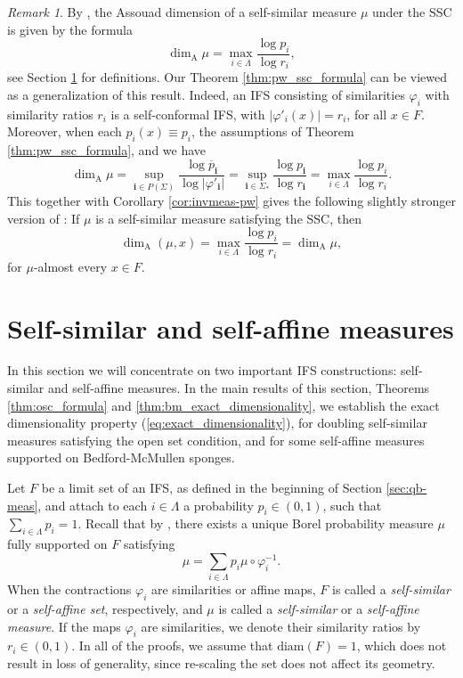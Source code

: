 \documentclass{PRM}
\newcommand{\diam}{\mathrm{diam}}
\theoremstyle{plain}
\theoremstyle{definition}
\theoremstyle{remark}
\newtheorem{huom}[thm]{Remark}
\begin{document}
\begin{huom}\label{huom:ssm}
By \cite[Theorem 2.4]{FH}, the Assouad dimension of a self-similar measure $\mu$ under the SSC is given by the formula
\begin{equation}\label{eq:ssc_formula}
    \dim_{\mathrm{A}}\mu=\max_{i\in\Lambda}\frac{\log p_i}{\log r_i},
\end{equation}
see Section \ref{sec:ssm} for definitions. Our Theorem \ref{thm:pw_ssc_formula} can be viewed as a generalization of this result. Indeed, an IFS consisting of similarities $\varphi_i$ with similarity ratios $r_i$ is a self-conformal IFS, with $|\varphi'_i(x)|=r_i$, for all $x\in F$. Moreover, when each $p_i(x)\equiv p_i$, the assumptions of Theorem \ref{thm:pw_ssc_formula}, and we have
\begin{equation*}
    \dim_{\mathrm{A}}\mu=\sup_{\mathbf{i}\in P(\Sigma)}\frac{\log \overline{p}_{\mathbf{i}}}{\log |\varphi'_{\mathbf{i}}|}=\sup_{\mathbf{i}\in \Sigma_*}\frac{\log p_{\mathbf{i}}}{\log r_{\mathbf{i}}}=\max_{i\in\Lambda}\frac{\log p_i}{\log r_i}.
\end{equation*}
This together with Corollary \ref{cor:invmeas-pw} gives the following slightly stronger version of \cite[Theorem 2.4]{FH}: If $\mu$ is a self-similar measure satisfying the SSC, then
\begin{equation*}
    \dim_{\mathrm{A}}(\mu,x)=\max_{i\in\Lambda}\frac{\log p_i}{\log r_i}=\dim_{\mathrm{A}}\mu,
\end{equation*}
for $\mu$-almost every $x\in F$.
\end{huom}

\section{Self-similar and self-affine measures}\label{sec:ssm}
In this section we will concentrate on two important IFS constructions: self-similar and self-affine measures. In the main results of this section, Theorems \ref{thm:osc_formula} and \ref{thm:bm_exact_dimensionality}, we establish the exact dimensionality property (\ref{eq:exact_dimensionality}), for doubling self-similar measures satisfying the open set condition, and for some self-affine measures supported on Bedford-McMullen sponges.

Let $F$ be a limit set of an IFS, as defined in the beginning of Section \ref{sec:qb-meas}, and attach to each $i\in\Lambda$ a probability $p_i\in(0,1)$, such that $\sum_{i\in\Lambda}p_i=1$. Recall that by \cite{H}, there exists a unique Borel probability measure $\mu$ fully supported on $F$ satisfying
\begin{equation*}
    \mu=\sum_{i\in\Lambda}p_i\mu\circ \varphi_i^{-1}.
\end{equation*}
When the contractions $\varphi_i$ are similarities or affine maps, $F$ is called a \emph{self-similar} or a \emph{self-affine set}, respectively, and $\mu$ is called a \emph{self-similar} or a \emph{self-affine measure}. If the maps $\varphi_i$ are similarities, we denote their similarity ratios by $r_i\in(0,1)$. In all of the proofs, we assume that $\diam(F)=1$, which does not result in loss of generality, since re-scaling the set does not affect its geometry.
\end{document}
